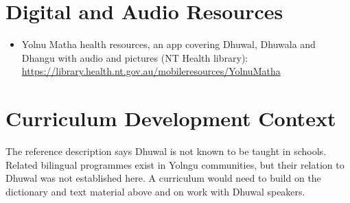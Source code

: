 \documentclass[12pt]{article}
\begin{document}
\section{Digital and Audio Resources}
\begin{itemize}
\item Yolnu Matha health resources, an app covering Dhuwal, Dhuwala and Dhangu with audio and pictures (NT Health library): \url{https://library.health.nt.gov.au/mobileresources/YolnuMatha}
\end{itemize}

\section{Curriculum Development Context}
The reference description says Dhuwal is not known to be taught in schools. Related bilingual programmes exist in Yolngu communities, but their relation to Dhuwal was not established here. A curriculum would need to build on the dictionary and text material above and on work with Dhuwal speakers.
\end{document}
